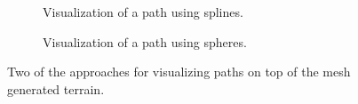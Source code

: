 \begin{figure}[H]
  \centering
  \begin{subfigure}[b]{0.4\textwidth}
    \caption{Visualization of a path using splines.}
  \end{subfigure}
  \quad
  \begin{subfigure}[b]{0.3\textwidth}
    \caption{Visualization of a path using spheres.}
  \end{subfigure}
  \caption{Two of the approaches for visualizing paths on top of the mesh generated terrain.}
  \label{fig:visuals}
\end{figure}
